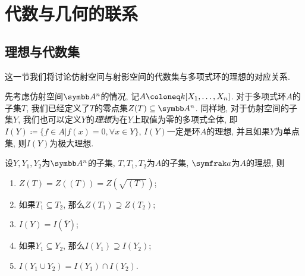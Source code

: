 
\section{代数与几何的联系}\label{sec:algebraandgeometry}


\subsection{理想与代数集}\label{sec:ag-ideal}

这一节我们将讨论仿射空间与射影空间的代数集与多项式环的理想的对应关系.

先考虑仿射空间$\AF^n$的情况, 记$A\coloneq \kk [X_1, \dotsc, X_n]$. 对于多项式环$A$的子集$T$, 我们已经定义了$T$的零点集$Z(T)\subseteq\AF^n$. 同样地, 对于仿射空间的子集$Y$, 我们也可以定义$Y$的\emph{理想}为在$Y$上取值为零的多项式全体, 即$I(Y)\coloneq \{f\in A\vert f(x)=0, \forall x\in Y\}$, $I(Y)$一定是环$A$的理想, 并且如果$Y$为单点集, 则$I(Y)$为极大理想.

\begin{propositionnoproof}\label{prop:affinegaloisconnectionclosedradicalpre}
  设$Y, Y_1, Y_2$为$\AF^n$的子集, $T, T_1, T_2$为$A$的子集, $\ideal{a}$为$A$的理想, 则
  \begin{enumerate}
    \item\label{enum:prop-affine-galois-connection-closed-radical-1} $Z(T)=Z((T))=Z(\sqrt{(T)})$;
    \item\label{enum:prop-affine-galois-connection-closed-radical-2} 如果$T_1\subseteq T_2$, 那么$Z(T_1)\supseteq Z(T_2)$;
    \item\label{enum:prop-affine-galois-connection-closed-radical-3} $I(Y)=I(\overline{Y})$;
    \item\label{enum:prop-affine-galois-connection-closed-radical-4} 如果$Y_1\subseteq Y_2$, 那么$I(Y_1)\supseteq I(Y_2)$;
    \item\label{enum:prop-affine-galois-connection-closed-radical-5} $I(Y_1\cup Y_2)=I(Y_1)\cap I(Y_2)$.
  \end{enumerate}
\end{propositionnoproof}

